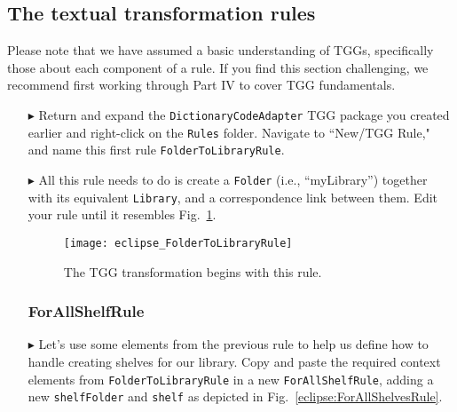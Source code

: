 \newpage
\hypertarget{treeToModel tex}{}
\subsection{The textual transformation rules}
\texHeader

Please note that we have assumed a basic understanding of TGGs, specifically those about each component of a rule. If you find this section challenging, we
recommend first working through Part IV to cover TGG fundamentals.

\begin{itemize}

\subsubsection{FolderToLibraryRule} %

\item[$\blacktriangleright$] Return and expand the \texttt{DictionaryCodeAdapter} TGG package you created earlier and right-click on the \texttt{Rules} folder.
Navigate to ``New/TGG Rule," and name this first rule \texttt{Folder\-To\-Lib\-rary\-Rule}.

\item[$\blacktriangleright$] All this rule needs to do is create a \texttt{Folder} (i.e., ``myLibrary'') together with its equivalent \texttt{Library}, and a
correspondence link between them. Edit your rule until it resembles Fig.~\ref{eclipse:FolderToLibraryRule}.

\vspace{0.5cm}

\begin{figure}[htbp]
\begin{center}
  \texttt{[image: eclipse\_FolderToLibraryRule]}
  \caption{The TGG transformation begins with this rule.}
  \label{eclipse:FolderToLibraryRule}
\end{center}
\end{figure}

\vspace{-0.5cm}

\subsubsection{ForAllShelfRule} %

\item[$\blacktriangleright$] Let's use some elements from the previous rule to help us define how to handle creating shelves for our library. Copy and paste the
required context elements from \texttt{FolderToLibraryRule} in a new \texttt{ForAllShelfRule}, adding a new \texttt{shelfFolder} and \texttt{shelf} as depicted
in Fig.~\ref{eclipse:ForAllShelvesRule}.


\end{itemize}
